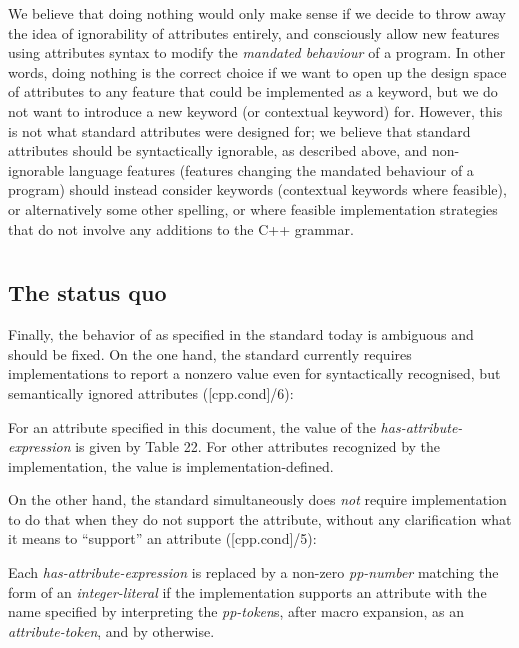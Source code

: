 We believe that doing nothing would only make sense if we decide to throw away the idea of ignorability of attributes entirely, and consciously allow new features using attributes syntax to modify the \emph{mandated behaviour} of a program. In other words, doing nothing is the correct choice if we want to open up the design space of attributes to any feature that could be implemented as a keyword, but we do not want to introduce a new keyword (or contextual keyword) for. However, this is not what standard attributes were designed for; we believe that standard attributes should be syntactically ignorable, as described above, and non-ignorable language features (features changing the mandated behaviour of a program) should instead consider keywords (contextual keywords where feasible), or alternatively some other spelling, or where feasible implementation strategies that do not involve any additions to the C++ grammar.

\section{}
\subsection{The status quo}

Finally, the behavior of  as specified in the standard today is ambiguous and should be fixed. On the one hand, the standard currently requires implementations to report a nonzero value even for syntactically recognised, but semantically ignored attributes ([cpp.cond]/6):

\begin{adjustwidth}{0.5cm}{0.5cm}
For an attribute specified in this document, the value of the \emph{has-attribute-expression} is given by Table 22. For other attributes recognized by the implementation, the value is implementation-defined.
\end{adjustwidth}

On the other hand, the standard simultaneously does \emph{not} require implementation to do that when they do not support the attribute, without any clarification what it means to ``support'' an attribute ([cpp.cond]/5):

\begin{adjustwidth}{0.5cm}{0.5cm}
Each \emph{has-attribute-expression} is replaced by a non-zero \emph{pp-number} matching the form of an \emph{integer-literal} if the implementation supports an attribute with the name specified by interpreting the \emph{pp-token}s, after macro expansion, as an \emph{attribute-token}, and by  otherwise.
\end{adjustwidth}


